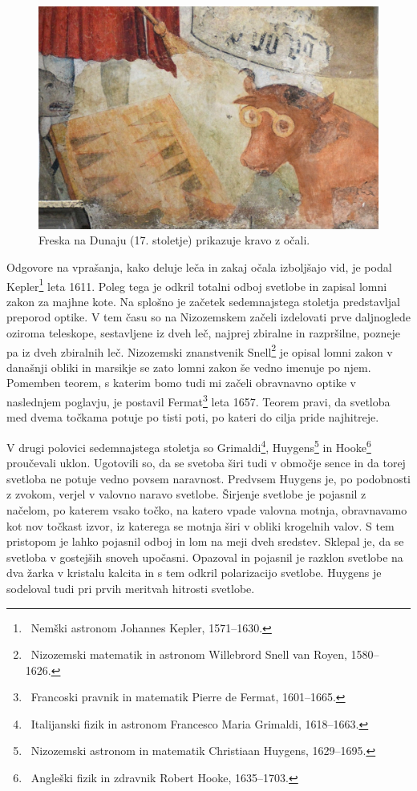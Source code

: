 \begin{figure}[ht]
\centering
\includegraphics[width=9truecm]{slike/01_Dunaj.jpg}
\caption{Freska na Dunaju (17. stoletje) prikazuje kravo z očali.}
\label{fig:01_Dunaj}
\end{figure}

Odgovore na vprašanja, kako deluje leča in zakaj očala izboljšajo vid, je podal
Kepler\footnote{~Nemški astronom Johannes Kepler, 1571--1630.} leta 1611. 
Poleg tega je odkril totalni odboj svetlobe in zapisal lomni zakon za majhne kote.
Na splošno je začetek sedemnajstega stoletja predstavljal preporod optike. 
V tem času so na Nizozemskem začeli izdelovati prve daljnoglede oziroma
teleskope, sestavljene iz dveh leč, 
najprej zbiralne in razpršilne, pozneje pa iz dveh zbiralnih leč. 
Nizozemski znanstvenik Snell\footnote{~Nizozemski matematik in astronom Willebrord 
Snell van Royen, 1580--1626.} je opisal lomni zakon v današnji obliki in 
marsikje se zato lomni zakon še vedno imenuje po njem. Pomemben teorem, s katerim
bomo tudi mi začeli obravnavno optike v naslednjem poglavju, je postavil 
Fermat\footnote{~Francoski pravnik in matematik Pierre de Fermat, 1601--1665.} 
leta 1657. Teorem pravi, da svetloba med dvema točkama potuje po tisti poti, 
po kateri do cilja pride najhitreje.

V drugi polovici sedemnajstega stoletja so Grimaldi\footnote{~Italijanski 
fizik in astronom Francesco Maria Grimaldi, 1618--1663.}, Huygens\footnote{~Nizozemski 
astronom in matematik Christiaan Huygens, 1629--1695.} in Hooke\footnote{~Angleški 
fizik in zdravnik Robert Hooke, 1635--1703.} proučevali uklon. Ugotovili so, da se 
svetoba širi tudi v območje sence in da torej svetloba ne potuje vedno 
povsem naravnost. Predvsem Huygens je, po podobnosti z zvokom, verjel v 
valovno naravo svetlobe. Širjenje svetlobe je pojasnil z načelom, 
po katerem vsako točko, na katero vpade valovna motnja, obravnavamo 
kot nov točkast izvor, iz katerega se motnja širi v obliki krogelnih valov. 
S tem pristopom je lahko pojasnil odboj in lom na meji dveh sredstev. Sklepal je, da
se svetloba v gostejših snoveh upočasni.
Opazoval in pojasnil je razklon svetlobe na dva žarka v kristalu kalcita 
in s tem odkril polarizacijo svetlobe. Huygens je sodeloval tudi pri 
prvih meritvah hitrosti svetlobe. 

